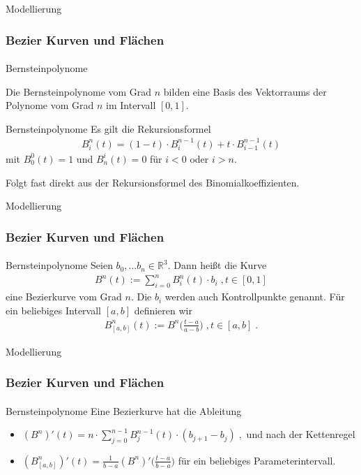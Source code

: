 \documentclass{beamer}
\begin{document}
\begin{frame}{Modellierung}
\frametitle{Bezier Kurven und Flächen}
\framesubtitle{}
 \begin{block}{Bernsteinpolynome}

Die Bernsteinpolynome vom Grad $n$ bilden eine Basis des Vektorraums der Polynome vom Grad $n$ im Intervall $[0,1]$.
\end{block}

 \begin{block}{Bernsteinpolynome}
Es gilt die Rekursionsformel
\begin{align*}
B_i^n(t) = (1-t) \cdot B^{n-1}_{i}(t) + t \cdot B^{n-1}_{i-1}(t)
\end{align*}
mit $B^0_0(t) = 1$ und $B^i_n(t) = 0$ für $i<0$ oder $i>n$.
\end{block}


Folgt fast direkt aus der Rekursionsformel des Binomialkoeffizienten.

\end{frame}

\begin{frame}{Modellierung}
\frametitle{Bezier Kurven und Flächen}
\framesubtitle{}
 \begin{block}{Bernsteinpolynome}
Seien $b_0, \hdots b_n \in \mathbb{R}^3$. Dann heißt die Kurve
\begin{align*}
B^n(t) := \sum_{i = 0}^{n} B_i^n(t) \cdot  b_i \; , t \in [0,1] 
\end{align*} 
eine Bezierkurve vom Grad $n$. Die $b_i$ werden auch Kontrollpunkte genannt.
Für ein beliebiges Intervall $[a,b]$ definieren wir
\begin{align*}
B^n_{[a,b]} (t):=  B^n\biggl( \frac{t-a }{a-b} \biggr) \; , t \in [a,b] \; .
\end{align*} 
\end{block}
\end{frame}

\begin{frame}{Modellierung}
\frametitle{Bezier Kurven und Flächen}
\framesubtitle{}
 \begin{block}{Bernsteinpolynome}
Eine Bezierkurve hat die Ableitung
\begin{itemize}
\item $(B^n)'(t) = n \cdot \sum_{j = 0}^{n-1} B_{j}^{n-1}(t) \cdot (b_{j+1} - b_j) \; ,$ und nach der Kettenregel
\item $(B^n_{[a,b]})'(t) = \frac{1}{b-a} (B^n)' \bigl(\frac{t -a}{b-a} \bigr)$  für ein beliebiges Parameterintervall.
\end{itemize}
\end{block}


\end{frame}
\end{document}
